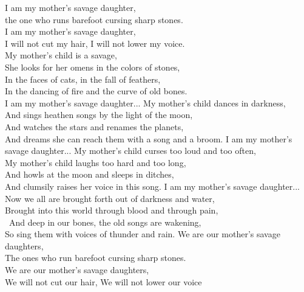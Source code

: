 
 I am my mother's savage daughter,\\
 the one who runs barefoot cursing sharp stones.\\
 I am my mother's savage daughter,\\
 I will not cut my hair, I will not lower my voice.\\
\hops
My mother's child is a savage,\\
She looks for her omens in the colors of stones,\\
In the faces of cats, in the fall of feathers,\\
In the dancing of fire and the curve of old bones.\\
\hops
{} I am my mother's savage daughter...
\hops
My mother's child dances in darkness,\\
And sings heathen songs by the light of the moon,\\
And watches the stars and renames the planets,\\
And dreams she can reach them with a song and a broom.
\hops
{} I am my mother's savage daughter...
\hops
My mother's child curses too loud and too often,\\
My mother's child laughs too hard and too long,\\
And howls at the moon and sleeps in ditches,\\
And clumsily raises her voice in this song.
\hops
{} I am my mother's savage daughter...
\hops
Now we all are brought forth out of darkness and water,\\
Brought into this world through blood and through pain,\\\
And deep in our bones, the old songs are wakening,\\
So sing them with voices of thunder and rain.
\hops
{} We are our mother's savage daughters,\\
 The ones who run barefoot cursing sharp stones.\\
 We are our mother's savage daughters,\\
\refr We will not cut our hair, We will not lower our voice